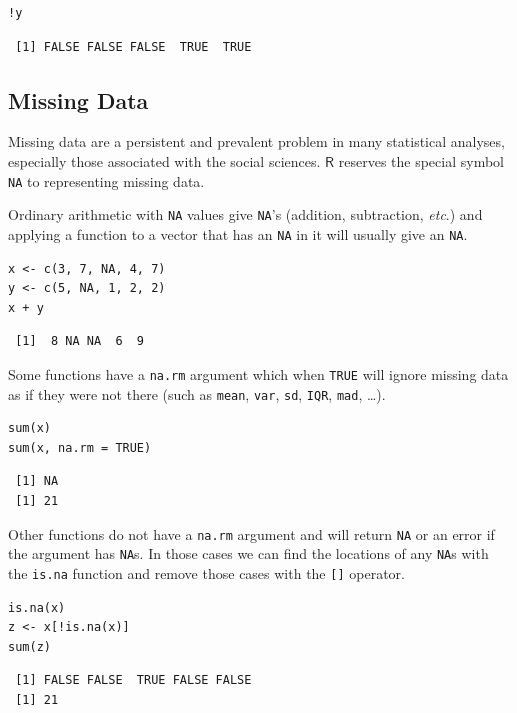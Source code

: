 \documentclass[captions=tableheading]{scrbook}
\begin{document}
\begin{verbatim}
!y
\end{verbatim}

\begin{verbatim}
 [1] FALSE FALSE FALSE  TRUE  TRUE
\end{verbatim}
\subsection{Missing Data}
\label{sec-3-1-6}
\label{sub-Missing-Data}


Missing data are a persistent and prevalent problem in many statistical analyses, especially those associated with the social sciences. \(\mathsf{R}\) reserves the special symbol \texttt{NA} to representing missing data.

Ordinary arithmetic with \texttt{NA} values give \texttt{NA}'s (addition, subtraction, \emph{etc}.) and applying a function to a vector that has an \texttt{NA} in it will usually give an \texttt{NA}.


\begin{verbatim}
x <- c(3, 7, NA, 4, 7)
y <- c(5, NA, 1, 2, 2)
x + y
\end{verbatim}

\begin{verbatim}
 [1]  8 NA NA  6  9
\end{verbatim}

Some functions have a \texttt{na.rm} argument which when \texttt{TRUE} will ignore missing data as if they were not there (such as \texttt{mean}, \texttt{var}, \texttt{sd}, \texttt{IQR}, \texttt{mad}, \ldots{}). 


\begin{verbatim}
sum(x)
sum(x, na.rm = TRUE)
\end{verbatim}

\begin{verbatim}
 [1] NA
 [1] 21
\end{verbatim}

Other functions do not have a \texttt{na.rm} argument and will return \texttt{NA} or an error if the argument has \texttt{NA}s. In those cases we can find the locations of any \texttt{NA}s with the \texttt{is.na} function and remove those cases with the \texttt{[]} operator.


\begin{verbatim}
is.na(x)
z <- x[!is.na(x)]
sum(z)
\end{verbatim}

\begin{verbatim}
 [1] FALSE FALSE  TRUE FALSE FALSE
 [1] 21
\end{verbatim}
\end{document}
